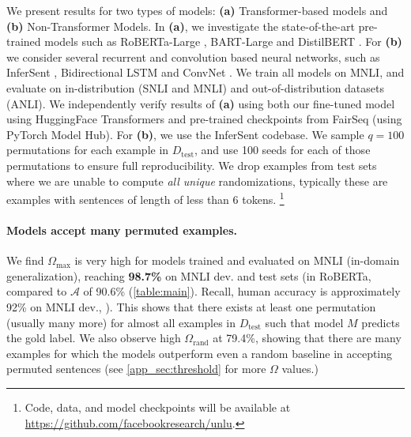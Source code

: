 \documentclass[11pt,a4paper]{article}
\begin{document}
We present results for two types of models: \textbf{(a)} Transformer-based models and \textbf{(b)} Non-Transformer Models. In \textbf{(a)}, we investigate the state-of-the-art pre-trained models such as RoBERTa-Large \cite{liu-et-al-2019-roberta}, BART-Large \cite{lewis-etal-2020-bart} and DistilBERT \cite{sanh2020distilbert}. For \textbf{(b)} we consider several recurrent and convolution based neural networks, such as InferSent \cite{conneau-etal-2017-supervised}, Bidirectional LSTM \cite{collobert2008unified} and ConvNet \cite{zhao2015self}. We train all models on MNLI, and evaluate on in-distribution (SNLI and MNLI) and out-of-distribution datasets (ANLI). We independently verify results of \textbf{(a)} using both our fine-tuned model using HuggingFace Transformers \cite{wolf2020transformers} and pre-trained checkpoints from FairSeq \cite{ott2019fairseq} (using PyTorch Model Hub). For \textbf{(b)}, we use the InferSent codebase. We sample $q=100$ permutations for each example in $D_{\text{test}}$, and use 100 seeds for each of those permutations to ensure full reproducibility. We drop examples from test sets where we are unable to compute \textit{all unique} randomizations, typically these are examples with sentences of length of less than 6 tokens. \footnote{Code, data, and model checkpoints will be available at \href{https://github.com/facebookresearch/unlu}{https://github.com/facebookresearch/unlu}.}


\paragraph{Models accept many permuted examples.}

We find $\Omega_{\text{max}}$ is very high for models trained and evaluated on MNLI (in-domain generalization), reaching \textbf{98.7\%} on MNLI dev. and test sets (in RoBERTa, compared to $\mathcal{A}$ of 90.6\% (\autoref{table:main}). Recall, human accuracy is approximately 92\% on MNLI dev.,  \citealt{nangia-bowman-2019-human}). This shows that there exists at least one permutation (usually many more) for almost all examples in $D_{\text{test}}$ such that model $M$ predicts the gold label. We also observe high $\Omega_{\text{rand}}$ at 79.4\%, showing that there are many examples for which the models outperform even a random baseline in accepting permuted sentences (see \autoref{app_sec:threshold} for more $\Omega$ values.)
\end{document}
